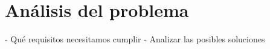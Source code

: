 \chapter{Análisis del problema}
 \label{analisis}
 - Qué requisitos necesitamos cumplir
 - Analizar las posibles soluciones